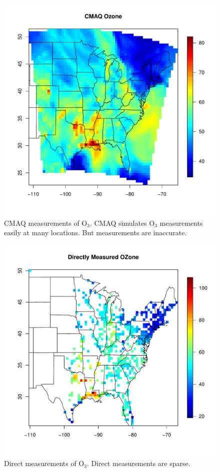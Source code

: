 \documentclass{article}                                                   %
\begin{document}
  \begin{figure}\begin{center}
    \includegraphics{raw/cmaq.pdf}
    \caption{CMAQ measurements of O$_3$. CMAQ simulates O$_3$ measurements
             easily at many locations. But measurements are inaccurate.}
  \end{center}\end{figure}

  \begin{figure}\begin{center}
    \includegraphics{raw/ozone.pdf}
    \caption{Direct measurements of O$_3$. Direct measurements are sparse.}
  \end{center}\end{figure}
\end{document}
